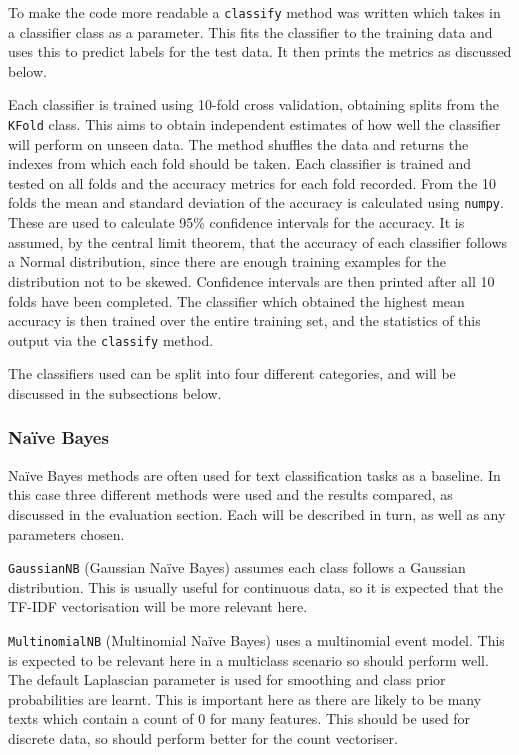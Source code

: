 \documentclass{article}
\begin{document}
To make the code more readable a \verb|classify| method was written which takes in a classifier class as a parameter. This fits the classifier to the training data and uses this to predict labels for the test data. It then prints the metrics as discussed below.

Each classifier is trained using 10-fold cross validation, obtaining splits from the \verb|KFold| class. This aims to obtain independent estimates of how well the classifier will perform on unseen data. The method shuffles the data and returns the indexes from which each fold should be taken. Each classifier is trained and tested on all folds and the accuracy metrics for each fold recorded. From the 10 folds the mean and standard deviation of the accuracy is calculated using \verb|numpy|. These are used to calculate 95\% confidence intervals for the accuracy. It is assumed, by the central limit theorem, that the accuracy of each classifier follows a Normal distribution, since there are enough training examples for the distribution not to be skewed. Confidence intervals are then printed after all 10 folds have been completed. The classifier which obtained the highest mean accuracy is then trained over the entire training set, and the statistics of this output via the \verb|classify| method.

The classifiers used can be split into four different categories, and will be discussed in the subsections below.

\subsubsection{Na{\"i}ve Bayes}
Na{\"i}ve Bayes methods are often used for text classification tasks as a baseline. In this case three different methods were used and the results compared, as discussed in the evaluation section. Each will be described in turn, as well as any parameters chosen.

\verb|GaussianNB| (Gaussian Na{\"i}ve Bayes) assumes each class follows a Gaussian distribution. This is usually useful for continuous data, so it is expected that the TF-IDF vectorisation will be more relevant here.

\verb|MultinomialNB| (Multinomial Na{\"i}ve Bayes) uses a multinomial event model. This is expected to be relevant here in a multiclass scenario so should perform well. The default Laplascian parameter is used for smoothing and class prior probabilities are learnt. This is important here as there are likely to be many texts which contain a count of 0 for many features. This should be used for discrete data, so should perform better for the count vectoriser.
\end{document}
